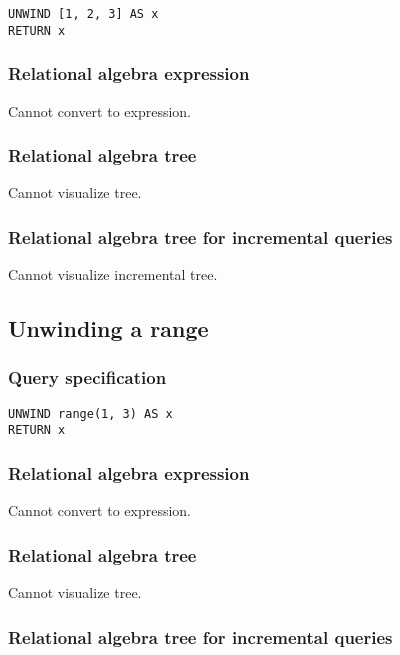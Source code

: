 \begin{lstlisting}
UNWIND [1, 2, 3] AS x
RETURN x
\end{lstlisting}

\subsubsection*{Relational algebra expression}

Cannot convert to expression.

\subsubsection*{Relational algebra tree}

Cannot visualize tree.

\subsubsection*{Relational algebra tree for incremental queries}

Cannot visualize incremental tree.

\subsection{Unwinding a range}

\subsubsection*{Query specification}

\begin{lstlisting}
UNWIND range(1, 3) AS x
RETURN x
\end{lstlisting}

\subsubsection*{Relational algebra expression}

Cannot convert to expression.

\subsubsection*{Relational algebra tree}

Cannot visualize tree.

\subsubsection*{Relational algebra tree for incremental queries}

